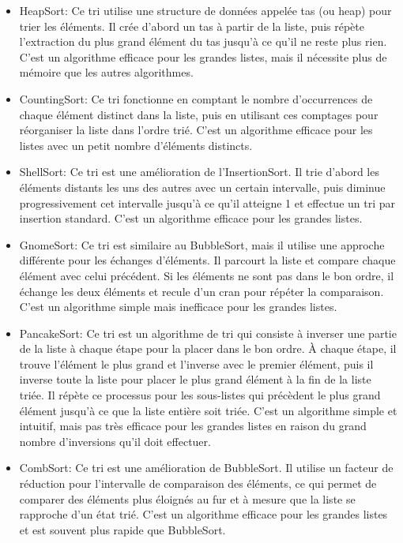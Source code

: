\documentclass[10pt,a4paper]{article}
\begin{document}
\begin{itemize}
        \item HeapSort: Ce tri utilise une structure de données appelée tas (ou heap) pour trier les éléments. Il crée d'abord un tas à partir de la liste, puis répète l'extraction du plus grand élément du tas jusqu'à ce qu'il ne reste plus rien. C'est un algorithme efficace pour les grandes listes, mais il nécessite plus de mémoire que les autres algorithmes.
    
        \item CountingSort: Ce tri fonctionne en comptant le nombre d'occurrences de chaque élément distinct dans la liste, puis en utilisant ces comptages pour réorganiser la liste dans l'ordre trié. C'est un algorithme efficace pour les listes avec un petit nombre d'éléments distincts.
    
        \item ShellSort: Ce tri est une amélioration de l'InsertionSort. Il trie d'abord les éléments distants les uns des autres avec un certain intervalle, puis diminue progressivement cet intervalle jusqu'à ce qu'il atteigne 1 et effectue un tri par insertion standard. C'est un algorithme efficace pour les grandes listes.
    
        \item GnomeSort: Ce tri est similaire au BubbleSort, mais il utilise une approche différente pour les échanges d'éléments. Il parcourt la liste et compare chaque élément avec celui précédent. Si les éléments ne sont pas dans le bon ordre, il échange les deux éléments et recule d'un cran pour répéter la comparaison. C'est un algorithme simple mais inefficace pour les grandes listes.
    
        \item PancakeSort: Ce tri est un algorithme de tri qui consiste à inverser une partie de la liste à chaque étape pour la placer dans le bon ordre. À chaque étape, il trouve l'élément le plus grand et l'inverse avec le premier élément, puis il inverse toute la liste pour placer le plus grand élément à la fin de la liste triée. Il répète ce processus pour les sous-listes qui précèdent le plus grand élément jusqu'à ce que la liste entière soit triée. C'est un algorithme simple et intuitif, mais pas très efficace pour les grandes listes en raison du grand nombre d'inversions qu'il doit effectuer.

        \item CombSort: Ce tri est une amélioration de BubbleSort. Il utilise un facteur de réduction pour l'intervalle de comparaison des éléments, ce qui permet de comparer des éléments plus éloignés au fur et à mesure que la liste se rapproche d'un état trié. C'est un algorithme efficace pour les grandes listes et est souvent plus rapide que BubbleSort.


\end{itemize}
\end{document}
